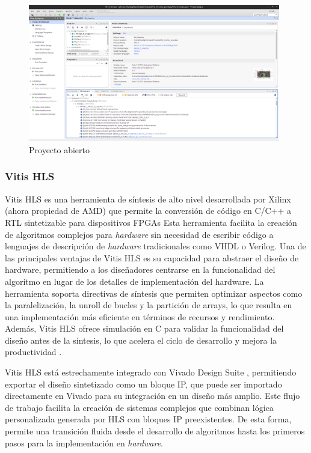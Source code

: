 \begin{figure}[!ht]
  \centering
  \includegraphics[width=11cm]{figures/proyectoVivado.png}
  \caption{Proyecto abierto}
  \label{fig:proyectoVivado}
\end{figure}

\subsubsection{Vitis HLS}
Vitis \ac{HLS} es una herramienta de síntesis de alto nivel desarrollada por Xilinx (ahora propiedad de AMD) que permite la conversión de código en C/C++ a RTL sintetizable para dispositivos FPGAs \cite{vitisHLSInfo} Esta herramienta facilita la creación de algoritmos complejos para \textit{hardware} sin necesidad de escribir código a lenguajes de descripción de \textit{hardware} tradicionales como VHDL o Verilog. Una de las principales ventajas de Vitis HLS es su capacidad para abstraer el diseño de hardware, permitiendo a los diseñadores centrarse en la funcionalidad del algoritmo en lugar de los detalles de implementación del hardware. La herramienta soporta directivas de síntesis que permiten optimizar aspectos como la paralelización, la unroll de bucles y la partición de arrays, lo que resulta en una implementación más eficiente en términos de recursos y rendimiento. Además, Vitis HLS ofrece simulación en C para validar la funcionalidad del diseño antes de la síntesis, lo que acelera el ciclo de desarrollo y mejora la productividad \cite{vitisHLSDocs}.

Vitis HLS está estrechamente integrado con Vivado Design Suite \cite{vitisVivadoRelacion}, permitiendo exportar el diseño sintetizado como un bloque IP, que puede ser importado directamente en Vivado para su integración en un diseño más amplio. Este flujo de trabajo facilita la creación de sistemas complejos que combinan lógica personalizada generada por HLS con bloques IP preexistentes. De esta forma, permite una transición fluida desde el desarrollo de algoritmos hasta los primeros pasos para la implementación en \textit{hardware}.

